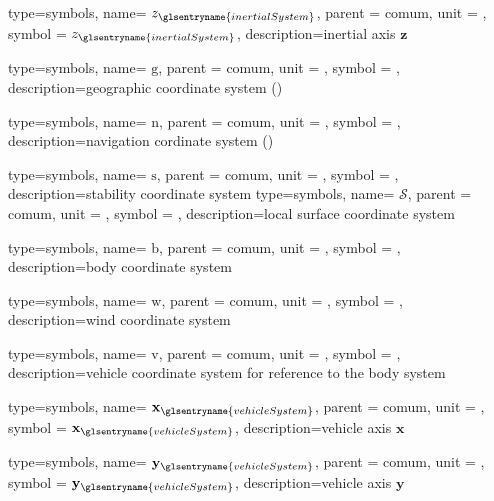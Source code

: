 {type=symbols,
	name= \ensuremath{z_{\glsentryname{inertialSystem}}},
	parent = {comum},
	unit = \unexpanded{},
	symbol = \ensuremath{z_{\glsentryname{inertialSystem}}},
	description={inertial axis $\mathbf{z}$}
}

{type=symbols,
	name= \ensuremath{\mathrm{g}},
	parent = {comum},
	unit = \unexpanded{},
	symbol = ,
	description={geographic coordinate system ()}
}

{type=symbols,
	name= \ensuremath{\mathrm{n}},
	parent = {comum},
	unit = \unexpanded{},
	symbol = ,
	description={navigation cordinate system  ()}
}

{type=symbols,
	name= \ensuremath{\mathrm{s}},
	parent = {comum},
	unit = \unexpanded{},
	symbol = ,
	description={stability coordinate system}
}
{type=symbols,
	name= \ensuremath{\mathcal{S}},
	parent = {comum},
	unit = \unexpanded{},
	symbol = ,
	description={local surface coordinate system}
}

{type=symbols,
	name= \ensuremath{\mathrm{b}},
	parent = {comum},
	unit = \unexpanded{},
	symbol = ,
	description={body coordinate system}
}

{type=symbols,
	name= \ensuremath{\mathrm{w}},
	parent = {comum},
	unit = \unexpanded{},
	symbol = ,
	description={wind coordinate system}
}

{type=symbols,
	name= \ensuremath{\mathrm{v}},
	parent = {comum},
	unit = \unexpanded{},
	symbol = ,
	description={vehicle coordinate system for reference to the body system}
}

{type=symbols,
name= \ensuremath{\mathbf{x}_{\glsentryname{vehicleSystem}}},
parent = {comum},
unit = \unexpanded{},
symbol = \ensuremath{\mathbf{x}_{\glsentryname{vehicleSystem}}},
description={vehicle axis $\mathbf{x}$}
}

{type=symbols,
name= \ensuremath{\mathbf{y}_{\glsentryname{vehicleSystem}}},
parent = {comum},
unit = \unexpanded{},
symbol = \ensuremath{\mathbf{y}_{\glsentryname{vehicleSystem}}},
description={vehicle axis $\mathbf{y}$}
}



